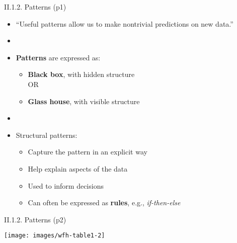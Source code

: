 \documentclass[handout]{beamer}
\newcommand{\strong}[1]{\textbf{\color{teal} #1}}
\newcommand{\stronger}[1]{\textbf{\color{purple} #1}}
\begin{document}
\begin{frame}{II.1.2. Patterns (p1)}
\begin{itemize}
\item[] ``Useful patterns allow us to make nontrivial predictions on new data.''~\cite[p5]{WFH3:2011}
\item[]
\item \stronger{Patterns} are expressed as:
	\begin{itemize}
	\item \strong{Black box}, with hidden structure\\OR
	\item \strong{Glass house}, with visible structure
	\end{itemize}
\item[]
\item Structural patterns:
	\begin{itemize}
	\item Capture the pattern in an explicit way
	\item Help explain aspects of the data
	\item Used to inform decisions
	\item Can often be expressed as \stronger{rules}, e.g., \emph{if-then-else}
	\end{itemize}
\end{itemize}
\end{frame}
\begin{frame}{II.1.2. Patterns (p2)}
\begin{center}
\texttt{[image: images/wfh-table1-2]}
\cite[Table 1.2]{WFH3:2011}
\end{center}
\end{frame}
\end{document}
